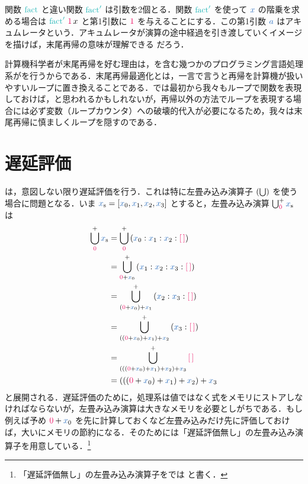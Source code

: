 \documentclass[a5paper,twoside,fleqn,draft]{jsbook}
\begin{document}
関数 $\mFact$ と違い関数 $\mFFact$ は引数を2個とる．関数 $\mFFact$ を使って $\hVar{x}$ の階乗を求める場合は $\mFFact\,\hConstant{1}\,x$ と第1引数に $\hConstant{1}$ を与えることにする．この第1引数 $\hVar{a}$ はアキュムレータという．アキュムレータが演算の途中経過を引き渡していくイメージを描けば，末尾再帰の意味が理解できる
だろう．

計算機科学者が末尾再帰を好む理由は，\haskell を含む幾つかのプログラミング言語処理系がを行うからである．末尾再帰最適化とは，一言で言うと再帰を計算機が扱いやすいループに置き換えることである．では最初から我々もループで関数を表現しておけば，と思われるかもしれないが，再帰以外の方法でループを表現する場合には必ず変数（ループカウンタ）への破壊的代入が必要になるため，我々は末尾再帰に慎ましくループを隠すのである．

\section{遅延評価}

\haskell は，意図しない限り遅延評価を行う．これは特に左畳み込み演算子 $(\operatorname*{\bigcup})$ を使う場合に問題となる．いま $\hListVar{x}=[\hVar{x}_0,\hVar{x}_1,\hVar{x}_2,\hVar{x}_3]$ とすると，左畳み込み演算 $\mFold^+_{\hConstant{0}}\hListVar{x}$ は
\begin{align}
  \mFold^+_{\hConstant{0}}\hListVar{x}
  &=\mFold^+_{\hConstant{0}}{}(\hVar{x}_0:\hVar{x}_1:\hVar{x}_2:\mEmptyList)\\
  &=\mFold^+_{\hConstant{0}+\hVar{x}_0}{}(\hVar{x}_1:\hVar{x}_2:\hVar{x}_3:\mEmptyList)\\
  &=\mFold^+_{(\hConstant{0}+\hVar{x}_0)+\hVar{x}_1}{}(\hVar{x}_2:\hVar{x}_3:\mEmptyList)\\
  &=\mFold^+_{((\hConstant{0}+\hVar{x}_0)+\hVar{x}_1)+\hVar{x}_2}{}(\hVar{x}_3:\mEmptyList)\\
  &=\mFold^+_{(((\hConstant{0}+\hVar{x}_0)+\hVar{x}_1)+\hVar{x}_2)+\hVar{x}_3}{}\mEmptyList\\
  &=(((\hConstant{0}+\hVar{x}_0)+\hVar{x}_1)+\hVar{x}_2)+\hVar{x}_3
\end{align}
と展開される．遅延評価のために，\haskell 処理系は値ではなく式をメモリにストアしなければならないが，左畳み込み演算は大きなメモリを必要としがちである．もし例えば予め $\hConstant{0}+\hVar{x}_0$ を先に計算しておくなど左畳み込みだけ先に評価しておけば，大いにメモリの節約になる．そのために\haskell は「遅延評価無し」の左畳み込み演算子を用意している．\footnote{「遅延評価無し」の左畳み込み演算子を\haskell では  と書く．}
\end{document}
